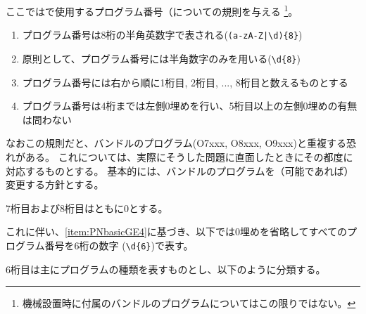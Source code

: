 


ここでは\DMname で使用するプログラム番号（についての規則を与える
\footnote{機械設置時に付属のバンドルのプログラムについてはこの限りではない。}。



\begin{enumerate}[label=\Roman*., ref=\Roman*]
\item プログラム番号は8桁の半角英数字で表される(\verb+(a-zA-Z|\d){8}+)
\item 原則として、プログラム番号には半角数字のみを用いる(\verb|\d{8}|)
\item プログラム番号には右から順に1桁目, 2桁目, ..., 8桁目と数えるものとする
\item\label{item:PNbasicGE4}プログラム番号は4桁までは左側0埋めを行い、5桁目以上の左側0埋めの有無は問わない
\end{enumerate}
\begin{hosoku}
なおこの規則だと、バンドルのプログラム(O7xxx, O8xxx, O9xxx)と重複する恐れがある。
これについては、実際にそうした問題に直面したときにその都度に対応するものとする。
基本的には、バンドルのプログラムを（可能であれば）変更する方針とする。
\end{hosoku}


7桁目および8桁目はともに0とする。

これに伴い、\ref{item:PNbasicGE4}に基づき、以下では0埋めを省略してすべてのプログラム番号を6桁の数字 (\verb|\d{6}|)で表す。


\clearpage
6桁目は主にプログラムの種類を表すものとし、以下のように分類する。

